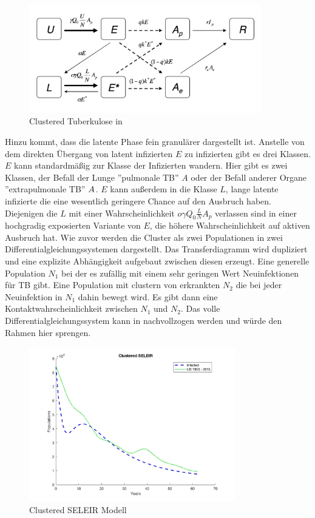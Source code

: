 \documentclass[paper=a4, fontsize=11pt, ngerman, abstract=on]{scrartcl}
\numberwithin{equation}{section} %
\numberwithin{figure}{section} %
\numberwithin{table}{section} %
\begin{document}
\begin{figure}[ht]
\centering
\includegraphics[width=0.9\textwidth,keepaspectratio]{images/clustered_seleir_model}
\caption{Clustered Tuberkulose in \cite{ModellingTBEpidemics2009}}
\label{fig:clustered-seleir}
\end{figure}

Hinzu kommt, dass die latente Phase fein granulärer dargestellt ist. Anstelle von dem direkten Übergang von latent infizierten $E$ zu infizierten gibt es drei Klassen. $E$ kann standardmäßig zur Klasse der Infizierten wandern. Hier gibt es zwei Klassen, der Befall der Lunge ''pulmonale TB'' $A$ oder der Befall anderer Organe ''extrapulmonale TB'' $A^{\*}$. $E$ kann außerdem in die Klasse $L$, lange latente infizierte die eine wesentlich geringere Chance auf den Ausbruch haben. Diejenigen die $L$ mit einer Wahrscheinlichkeit $o\gamma Q_{0}\frac{L}{N}A_{p}$ verlassen sind in einer hochgradig exposierten Variante von $E$, die höhere Wahrscheinlichkeit auf aktiven Ausbruch hat. Wie zuvor werden die Cluster als zwei Populationen in zwei Differentialgleichungssystemen dargestellt. Das Transferdiagramm wird dupliziert und eine explizite Abhängigkeit aufgebaut zwischen diesen erzeugt. Eine generelle Population $N_{1}$ bei der es zufällig mit einem sehr geringen Wert Neuinfektionen für TB gibt. Eine Population mit clustern von erkrankten $N_{2}$ die bei jeder Neuinfektion in $N_{1}$ dahin bewegt wird. Es gibt dann eine Kontaktwahrscheinlichkeit zwischen $N_{1}$ und $N_{2}$. Das volle Differentialgleichungssystem kann in \cite{ModellingTBEpidemics2009} nachvollzogen werden und würde den Rahmen hier sprengen. \\

\begin{figure}[ht]
\centering
\includegraphics[width=0.8\textwidth,keepaspectratio]{images/clustered_seleir_against_us_data}
\caption{Clustered SELEIR Modell}
\label{fig:clustered-seleir-compare}
\end{figure}
\end{document}
